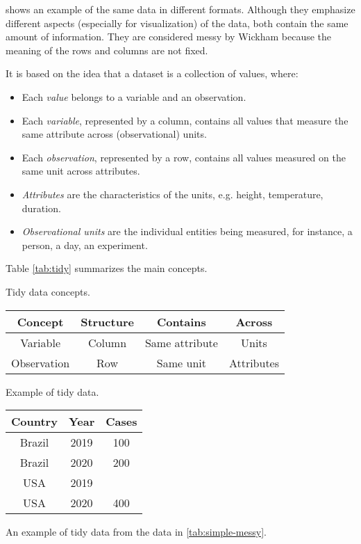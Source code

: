  shows an example of the same data in different formats.  Although
they emphasize different aspects (especially for visualization) of the data, both contain
the same amount of information.  They are considered messy by Wickham because the meaning
of the rows and columns are not fixed.

It is based on the idea that a dataset is a collection of values, where:
\begin{itemize}
  \itemsep0em
  \item Each \emph{value} belongs to a variable and an observation.
  \item Each \emph{variable}, represented by a column, contains all values that measure
    the same attribute across (observational) units.
  \item Each \emph{observation}, represented by a row, contains all values measured on the
    same unit across attributes.
  \item \emph{Attributes} are the characteristics of the units, e.g. height, temperature,
    duration.
  \item \emph{Observational units} are the individual entities being measured, for
    instance, a person, a day, an experiment.
\end{itemize}
Table \ref{tab:tidy} summarizes the main concepts.

\begin{tablebox}[label=tab:tidy]{Tidy data concepts.}
  \centering
  \begin{tabular}{cccc}
    \toprule
    \textbf{Concept} & \textbf{Structure} & \textbf{Contains} & \textbf{Across} \\
    \midrule
    Variable & Column & Same attribute & Units \\
    Observation & Row & Same unit & Attributes \\
    \bottomrule
  \end{tabular}
\end{tablebox}

\begin{tablebox}[label=tab:simple-tidy]{Example of tidy data.}
  \centering
  \begin{tabular}{ccc}
    \toprule
    \textbf{Country} & \textbf{Year} & \textbf{Cases} \\
    \midrule
    Brazil & 2019 & 100 \\
    Brazil & 2020 & 200 \\
    USA & 2019 & \\
    USA & 2020 & 400 \\
    \bottomrule
  \end{tabular}
  \tcblower
  An example of tidy data from the data in \cref{tab:simple-messy}.
\end{tablebox}

